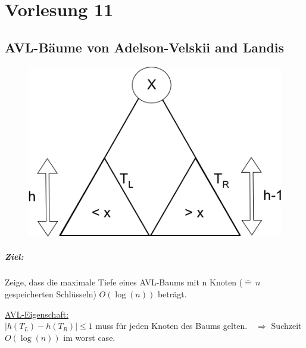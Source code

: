 \chapter{Vorlesung 11}
\section{AVL-Bäume von Adelson-Velskii and Landis}


\begin{minipage}[t]{0.4\textwidth}
\begin{figure}[H]
\includegraphics[width=\textwidth,left]{11/Grafik/img1.png}\\
\end{figure}
\end{minipage}%
%
\begin{minipage}[t]{0.55\textwidth}
\hspace{5mm}
\paragraph{Ziel:}%
Zeige, dass die maximale Tiefe eines AVL-Baums mit n Knoten ($\hat{=}~ n$ gespeicherten Schlüsseln) $O(\log(n))$ beträgt.\\
\end{minipage}


\underline{AVL-Eigenschaft:}\\ $|h(T_L)-h(T_R)| \leq 1$ muss für jeden Knoten des Baums gelten. $~~~\Rightarrow$ Suchzeit $O(\log(n))$ im worst case.\\
\newline


